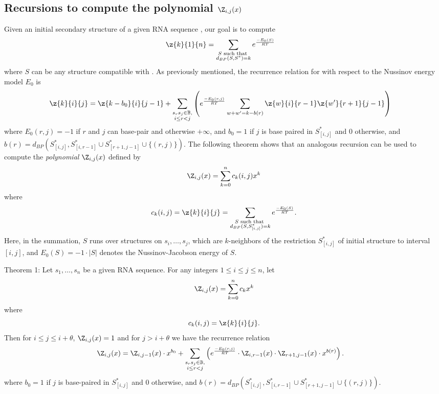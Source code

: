 \subsection*{Recursions to compute the polynomial $\Z_{i,j}(x)$}
\label{section:recursionsForPolynomialZij}

Given an initial secondary structure \strSt of a
given RNA sequence \seq, our goal is to compute
\begin{align}
\label{eq:defZk}
\z{k}{1}{n} &= \sum_{\substack{S \text{ such that }\\ d_{BP}(S,S^*)=k}}
e^{\frac{-E_0(S)}{RT}}
\end{align}
where $S$ can be any structure compatible with \seq.
As previously mentioned, the recurrence relation for \rnabor
with respect to the Nussinov energy model $E_0$ is
\begin{align}
\label{eq:RNAborNussRecursion}
\z{k}{i}{j} &= \z{k-b_0}{i}{j-1} + \sum_{\substack{s_r s_j \in \mathbb{B},\\i\le r<j}}\left(e^{\frac{-E_0(r,j)}{RT}}\sum_{w+w'=k-b(r)}
\z{w}{i}{r-1}  \z{w'}{r+1}{j-1} \right)
\end{align}
where $E_0(r,j)=-1$ if $r$ and $j$ can base-pair and otherwise
$+\infty$, and
$b_0 = 1$ if $j$ is base paired in $S^*_{[i,j]}$ and $0$ otherwise, and
$b(r)=d_{BP}(S^*_{[i,j]}, S^*_{[i,r-1]} \cup S^*_{[r+1,j-1]} \cup\{(r,j)\})$.
The following theorem shows that an analogous recursion can be used to compute
the {\em polynomial} $\Z_{i,j}(x)$ defined by
\begin{eqnarray}
\label{eq:defZijpolynomial}
\Z_{i,j}(x) = \sum_{k=0}^n c_k(i,j) x^k
\end{eqnarray}
where
\[ c_k(i,j)= \z{k}{i}{j} =
\sum_{\substack{S \text{ such that }\\ d_{BP}(S,S^*_{[i,j]})=k}}
e^{\frac{-E_0(S)}{RT}}.
\]
Here, in the summation, $S$ runs over structures on $s_i,\ldots,s_j$, which
are $k$-neighbors of the restriction $S^*_{[i,j]}$ of initial structure
\strSt to interval $[i,j]$, and
$E_0(S)=-1 \cdot |S|$ denotes the Nussinov-Jacobson energy of $S$.
\medskip

\noindent
{\sc Theorem 1:} Let $s_1,\ldots,s_n$ be a given RNA sequence.
For any integers $1 \leq i \leq j \leq n$, let
\begin{eqnarray*}
\Z_{i,j}(x) = \sum_{k=0}^n c_k x^k
\end{eqnarray*}
where
\[ c_k(i,j)= \z{k}{i}{j}.
\]
Then  for $i\leq j \leq i+\theta$, $\Z_{i,j}(x)=1$ and for
$j>i+\theta$ we have the recurrence relation
\begin{eqnarray}
\label{eq:polynomialRecursionNussJac}
\Z_{i,j}(x) &= \Z_{i,j-1}(x) \cdot x^{b_0} +
\sum_{\substack{s_r s_j \in \mathbb{B},\\i\le r<j}}
\left(e^{\frac{-E_0(r,j)}{RT}}\cdot
\Z_{i,r-1}(x)\cdot\Z_{r+1,j-1}(x)\cdot x^{b(r)} \right).
\end{eqnarray}
\medskip
where $b_0 = 1$ if $j$ is base-paired in $S^*_{[i,j]}$ and $0$ otherwise, and
$b(r)=d_{BP}(S^*_{[i,j]}, S^*_{[i,r-1]} \cup S^*_{[r+1,j-1]} \cup\{(r,j)\})$.

